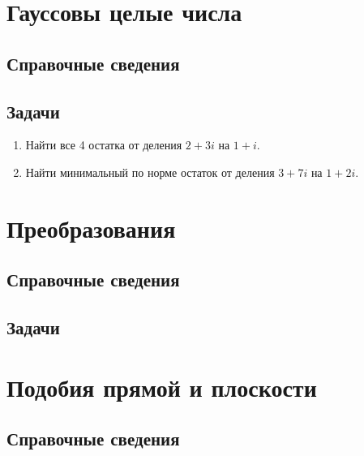 \section{Гауссовы целые числа}

\subsection*{Справочные сведения}

\subsection*{Задачи}

\begin{enumerate}
\item Найти все 4 остатка от деления $2+3i$ на $1+i$.
\item Найти минимальный по норме остаток от деления $3+7i$ на $1+2i$.
\end{enumerate}


\begin{comment}
\chapter{13. Введение в линейную алгебру}
\end{comment}
\label{linalg}


\section{Преобразования}

\subsection*{Справочные сведения}

\subsection*{Задачи}




\section{Подобия прямой и плоскости}


\subsection*{Справочные сведения}

